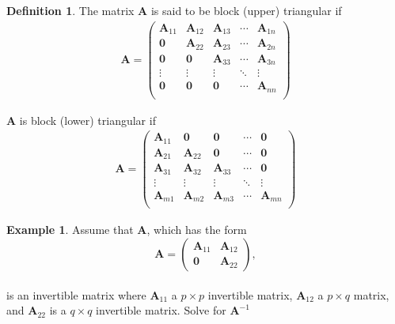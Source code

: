 \documentclass[
]{book}
\theoremstyle{definition}
\newtheorem{definition}{Definition}[chapter]
\theoremstyle{definition}
\newtheorem{example}{Example}[chapter]
\theoremstyle{definition}
\theoremstyle{definition}
\theoremstyle{remark}
\begin{document}
\begin{definition}
The matrix \(\mathbf{A}\) is said to be block (upper) triangular if
\[
\begin{aligned}
\mathbf{A} = \begin{pmatrix} 
\mathbf{A}_{11} & \mathbf{A}_{12} & \mathbf{A}_{13} & \cdots & \mathbf{A}_{1n} \\
\mathbf{0} & \mathbf{A}_{22} & \mathbf{A}_{23} & \cdots & \mathbf{A}_{2n} \\
\mathbf{0} & \mathbf{0} & \mathbf{A}_{33} & \cdots & \mathbf{A}_{3n} \\
\vdots & \vdots & \vdots & \ddots & \vdots \\
\mathbf{0} & \mathbf{0} & \mathbf{0} & \cdots & \mathbf{A}_{nn} \\
\end{pmatrix}
\end{aligned}
\]

\(\mathbf{A}\) is block (lower) triangular if\\
\[
\begin{aligned}
\mathbf{A} = \begin{pmatrix} 
\mathbf{A}_{11} & \mathbf{0} & \mathbf{0} & \cdots & \mathbf{0} \\
\mathbf{A}_{21} & \mathbf{A}_{22} & \mathbf{0} & \cdots & \mathbf{0} \\
\mathbf{A}_{31} & \mathbf{A}_{32} & \mathbf{A}_{33} & \cdots & \mathbf{0} \\
\vdots & \vdots & \vdots & \ddots & \vdots \\
\mathbf{A}_{m1} & \mathbf{A}_{m2} & \mathbf{A}_{m3} & \cdots & \mathbf{A}_{mn} \\
\end{pmatrix}
\end{aligned}
\]
\end{definition}

\begin{example}
Assume that \(\mathbf{A}\), which has the form
\[
\mathbf{A} = \begin{pmatrix} \mathbf{A}_{11} & \mathbf{A}_{12} \\ \mathbf{0} & \mathbf{A}_{22} \end{pmatrix},  
\]\\
is an invertible matrix where \(\mathbf{A}_{11}\) a \(p \times p\) invertible matrix, \(\mathbf{A}_{12}\) a \(p \times q\) matrix, and \(\mathbf{A}_{22}\) is a \(q \times q\) invertible matrix. Solve for \(\mathbf{A}^{-1}\)
\end{example}
\end{document}
